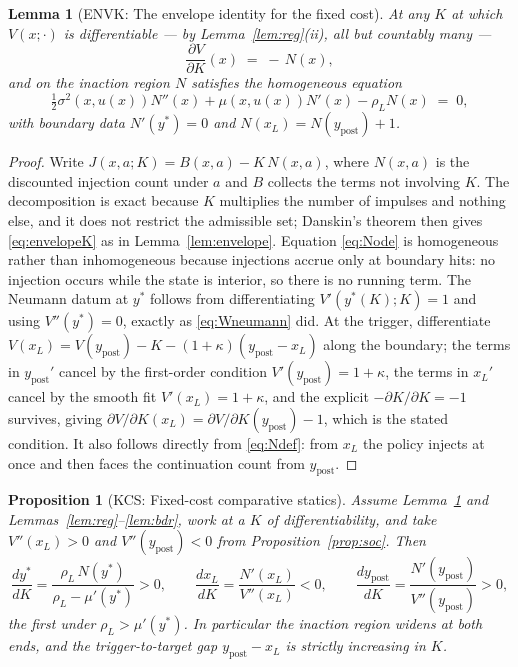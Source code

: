 \documentclass[11pt]{article}
\newtheorem{proposition}{Proposition}
\newtheorem{lemma}{Lemma}
\theoremstyle{remark}
\begin{document}
\begin{lemma}[ENVK: The envelope identity for the fixed cost]
\label{lem:envelopeK}
At any $K$ at which $V(x;\cdot)$ is differentiable --- by
Lemma~\ref{lem:reg}(ii), all but countably many ---
\begin{equation}
\frac{\partial V}{\partial K}(x) \;=\; -\,N(x),
\label{eq:envelopeK}
\end{equation}
and on the inaction region $N$ satisfies the \emph{homogeneous} equation
\begin{equation}
\tfrac12\sigma^2(x,u(x))N''(x) + \mu(x,u(x))N'(x) - \rho_L N(x) \;=\; 0 ,
\label{eq:Node}
\end{equation}
with boundary data $N'(y^*)=0$ and $N(x_L) = N(y_{\mathrm{post}}) + 1$.
\end{lemma}

\begin{proof}
Write $J(x,a;K) = B(x,a) - K\,N(x,a)$, where $N(x,a)$ is the discounted
injection count under $a$ and $B$ collects the terms not involving $K$.
The decomposition is exact because $K$ multiplies the number of impulses
and nothing else, and it does not restrict the admissible set; Danskin's
theorem then gives \eqref{eq:envelopeK} as in Lemma~\ref{lem:envelope}.
Equation \eqref{eq:Node} is homogeneous rather than inhomogeneous because
injections accrue only at boundary hits: no injection occurs while the
state is interior, so there is no running term. The Neumann datum at $y^*$
follows from differentiating $V'(y^*(K);K)=1$ and using $V''(y^*)=0$,
exactly as \eqref{eq:Wneumann} did. At the trigger, differentiate
$V(x_L) = V(y_{\mathrm{post}}) - K - (1+\kappa)(y_{\mathrm{post}}-x_L)$
along the boundary; the terms in $y_{\mathrm{post}}'$ cancel by the
first-order condition $V'(y_{\mathrm{post}})=1+\kappa$, the terms in
$x_L'$ cancel by the smooth fit $V'(x_L)=1+\kappa$, and the explicit
$-\partial K/\partial K = -1$ survives, giving
$\partial V/\partial K(x_L) = \partial V/\partial K(y_{\mathrm{post}}) - 1$,
which is the stated condition. It also follows directly from
\eqref{eq:Ndef}: from $x_L$ the policy injects at once and then faces the
continuation count from $y_{\mathrm{post}}$.
\end{proof}

\begin{proposition}[KCS: Fixed-cost comparative statics]
\label{prop:kcs}
Assume Lemma~\ref{lem:envelopeK} and Lemmas~\ref{lem:reg}--\ref{lem:bdr},
work at a $K$ of differentiability, and take $V''(x_L)>0$ and
$V''(y_{\mathrm{post}})<0$ from Proposition~\ref{prop:soc}. Then
\begin{equation}
\frac{dy^*}{dK} = \frac{\rho_L\,N(y^*)}{\rho_L - \mu'(y^*)} > 0,
\qquad
\frac{dx_L}{dK} = \frac{N'(x_L)}{V''(x_L)} < 0,
\qquad
\frac{dy_{\mathrm{post}}}{dK} = \frac{N'(y_{\mathrm{post}})}{V''(y_{\mathrm{post}})} > 0,
\label{eq:kcs}
\end{equation}
the first under $\rho_L > \mu'(y^*)$. In particular the inaction region
widens at both ends, and the trigger-to-target gap
$y_{\mathrm{post}} - x_L$ is strictly increasing in $K$.
\end{proposition}
\end{document}
